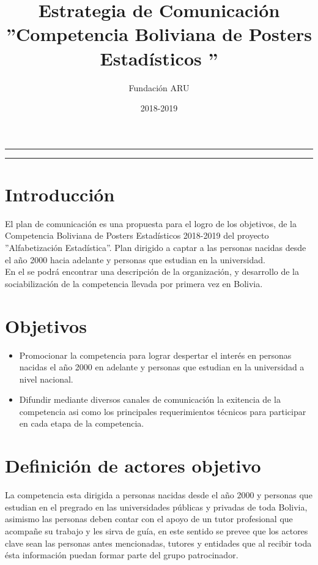 \documentclass{article}
\title{\textbf{Estrategia de Comunicación} \\ ''Competencia Boliviana de Posters Estadísticos ''}
\author{Fundación ARU}
\date{2018-2019 }
\begin{document}
\maketitle

\hrule
\hrule
\newpage

\section{Introducción}

El plan de comunicación es una propuesta para el logro de los objetivos, de la Competencia Boliviana de Posters Estadísticos 2018-2019 del proyecto ''Alfabetización Estadística''. Plan dirigido a captar a las personas nacidas desde el año 2000 hacia adelante y personas que estudian en la universidad.\\

En el se podrá encontrar una descripción de la organización, y desarrollo de la sociabilización de la competencia llevada por primera vez en Bolivia.


\section{Objetivos}


\begin{itemize}
\item Promocionar la competencia para lograr despertar el interés en personas nacidas el año 2000 en adelante y personas que estudian en la universidad a nivel nacional. 

\item Difundir mediante diversos canales de comunicación la exitencia de la competencia asi como los principales requerimientos técnicos para participar en cada etapa de la competencia.
\end{itemize} 

\section{Definición de actores objetivo}

La competencia esta dirigida a personas nacidas desde el año 2000 y personas que estudian en el pregrado en las universidades públicas y privadas de toda Bolivia, asimismo las personas deben contar con el apoyo de un tutor profesional que acompañe su trabajo y les sirva de guía, en este sentido se prevee que los actores clave sean las personas antes mencionadas, tutores y entidades que al recibir toda ésta información puedan formar parte del grupo patrocinador.
\end{document}
